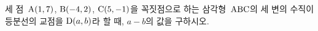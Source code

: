 세 점~$\mathrm{A}(1{,}\mkern3mu\mathopen{}7)$, $\mathrm{B}(-4{,}\mkern3mu\mathopen{}2)$, $\mathrm{C}(5{,}\mkern3mu\mathopen{}-1)$을 꼭짓점으로 하는 삼각형~$\mathrm{ABC}$의 세 변의 수직이등분선의 교점을 $\mathrm{D}(a{,}\mkern3mu\mathopen{}b)$라 할 때, $a-b$의 값을 구하시오.
